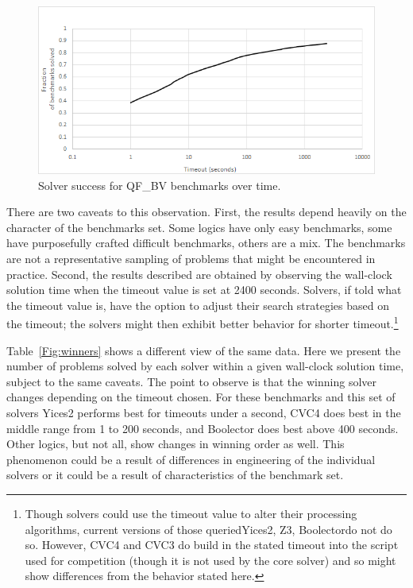 \documentclass[twoside,11pt]{article}
\begin{document}
\begin{figure}
\begin{center}
\includegraphics[width=.95\textwidth]{QF_BV-timeout-logscale2.png}
\end{center}
\caption{Solver success for QF\_BV benchmarks over time.}
\label{Fig:timeouts}
\end{figure}

There are two caveats to this observation. First, the results depend heavily on the character of the benchmarks set. Some logics have only easy benchmarks, some have purposefully crafted difficult benchmarks, others are a mix. The benchmarks are not a representative sampling of problems that might be encountered in practice.  Second, the results described are obtained by observing the wall-clock solution time when the timeout value is set at 2400 seconds. Solvers, if told what the timeout value is, have the option to adjust their search strategies based on the timeout; the solvers might then exhibit better behavior for shorter timeout.\footnote{Though solvers could use the timeout value to alter their processing algorithms, current versions of those queried\textemdash Yices2, Z3, Boolector\textemdash do not do so. However, CVC4 and CVC3 do build in the stated timeout into the script used for competition (though it is not used by the core solver) and so might show differences from the behavior stated here.}

Table~\ref{Fig:winners} shows a different view of the same data. Here we present the number of problems solved by each solver within a given wall-clock solution time, subject to the same caveats. The point to observe is that the winning solver changes depending on the timeout chosen. For these benchmarks and this set of solvers Yices2 performs best for timeouts under a second, CVC4 does best in the middle range from 1 to 200 seconds, and Boolector does best above 400 seconds. Other logics, but not all, show changes in winning order as well. This phenomenon could be a result of differences in engineering of the individual solvers or it could be a result of characteristics of the benchmark set.
\end{document}
